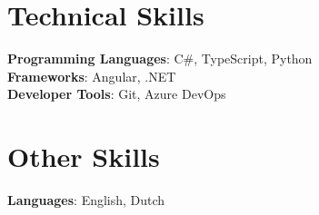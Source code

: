 \documentclass[letterpaper,11pt]{article}
\begin{document}
	
	
	\section{Technical Skills}
	\begin{itemize}[leftmargin=0.15in, label={}]
		\small{\item{
				\textbf{Programming Languages}{: C\#, TypeScript, Python} \\
				\textbf{Frameworks}{: Angular, .NET} \\
				\textbf{Developer Tools}{: Git, Azure DevOps} \\
		}}
	\end{itemize}
	
	
	
	\section{Other Skills}
	\begin{itemize}[leftmargin=0.15in, label={}]
		\small{\item{
				\textbf{Languages}{: English, Dutch} \\
		}}
	\end{itemize}
\end{document}

